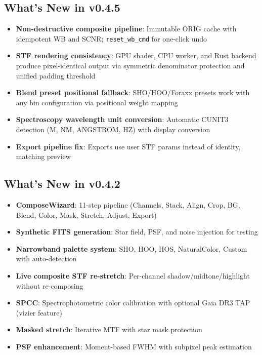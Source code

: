 \documentclass[11pt,a4paper]{article}
\newcommand{\code}[1]{\texttt{\small #1}}
\begin{document}
    \subsection{What's New in v0.4.5}
    \begin{itemize}[nosep]
    \item \textbf{Non-destructive composite pipeline}: Immutable ORIG cache with idempotent WB and SCNR; \code{reset\_wb\_cmd} for one-click undo
    \item \textbf{STF rendering consistency}: GPU shader, CPU worker, and Rust backend produce pixel-identical output via symmetric denominator protection and unified padding threshold
    \item \textbf{Blend preset positional fallback}: SHO/HOO/Foraxx presets work with any bin configuration via positional weight mapping
    \item \textbf{Spectroscopy wavelength unit conversion}: Automatic CUNIT3 detection (M, NM, ANGSTROM, HZ) with display conversion
    \item \textbf{Export pipeline fix}: Exports use user STF params instead of identity, matching preview
    \end{itemize}

    \subsection{What's New in v0.4.2}
    \begin{itemize}[nosep]
    \item \textbf{ComposeWizard}: 11-step pipeline (Channels, Stack, Align, Crop, BG, Blend, Color, Mask, Stretch, Adjust, Export)
    \item \textbf{Synthetic FITS generation}: Star field, PSF, and noise injection for testing
    \item \textbf{Narrowband palette system}: SHO, HOO, HOS, NaturalColor, Custom with auto-detection
    \item \textbf{Live composite STF re-stretch}: Per-channel shadow/midtone/highlight without re-composing
    \item \textbf{SPCC}: Spectrophotometric color calibration with optional Gaia DR3 TAP (vizier feature)
    \item \textbf{Masked stretch}: Iterative MTF with star mask protection
    \item \textbf{PSF enhancement}: Moment-based FWHM with subpixel peak estimation
    \end{itemize}
\end{document}
